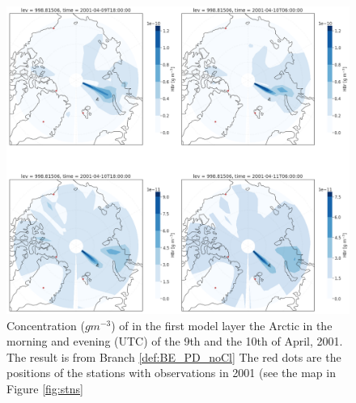 \begin{figure}[ht]
    \centering
    \includegraphics[width = \linewidth]{Chapter6_Results/images/polarHBr_noCl.png}
    \caption{Concentration ($g m^{-3}$) of  in the first model layer the Arctic in the morning and evening (UTC) of the 9th and the 10th of April, 2001. The result is from Branch \ref{def:BE_PD_noCl} The red dots are the positions of the stations with observations in 2001 (see the map in Figure \ref{fig:stns}}
    \label{fig:polarHBr_noCl}
\end{figure}